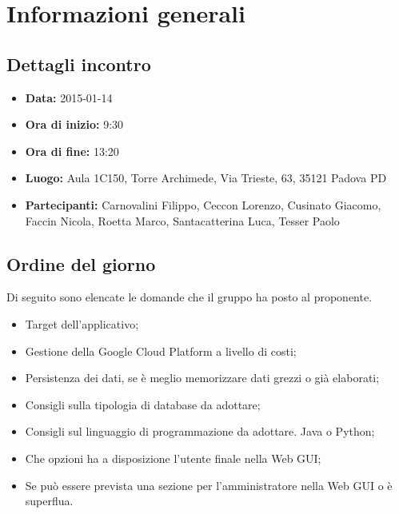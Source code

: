 %


\section{Informazioni generali} %
\label{sec:informazioni_generali}
	\subsection{Dettagli incontro} %
	\label{sub:dettagli_incontro}
		\begin{itemize}
			\item \textbf{Data:} 2015-01-14
			\item \textbf{Ora di inizio:} 9:30
			\item \textbf{Ora di fine:} 13:20
			\item \textbf{Luogo:} Aula 1C150, Torre Archimede, Via Trieste, 63, 35121 Padova PD
			\item \textbf{Partecipanti:} Carnovalini Filippo, Ceccon Lorenzo, Cusinato Giacomo, Faccin Nicola, Roetta Marco, Santacatterina Luca, Tesser Paolo
		\end{itemize}
	
	\subsection{Ordine del giorno} %
	\label{sub:ordine_del_giorno}
	Di seguito sono elencate le domande che il gruppo ha posto al proponente.
		\begin{itemize}
			\item Target dell'applicativo;
			\item Gestione della Google Cloud Platform a livello di costi;
			\item Persistenza dei dati, se è meglio memorizzare dati grezzi o già elaborati;
			\item Consigli sulla tipologia di database da adottare;
			\item Consigli sul linguaggio di programmazione da adottare. Java o Python;
			\item Che opzioni ha a disposizione l'utente finale nella Web GUI;
			\item Se può essere prevista una sezione per l'amministratore nella Web GUI o è superflua.
		\end{itemize}
